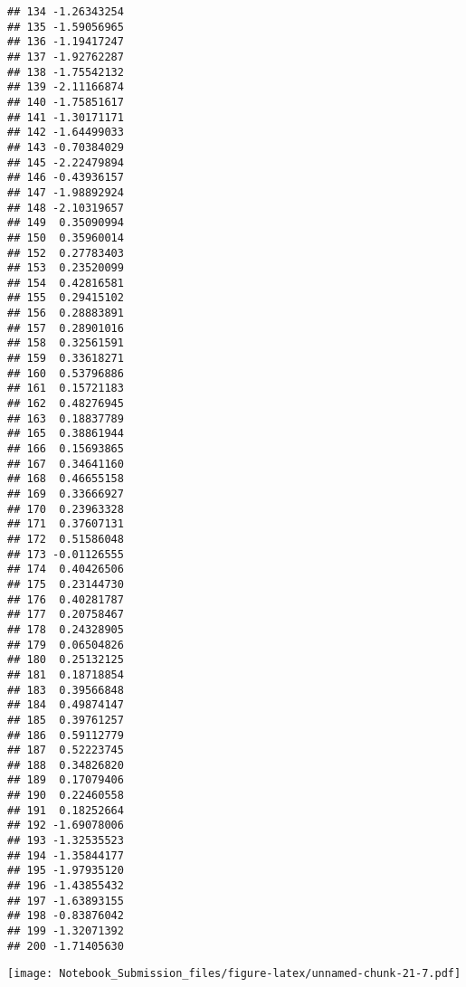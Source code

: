 \documentclass[
]{article}
\newenvironment{Shaded}{\begin{snugshade}}{\end{snugshade}}
\newcommand{\CommentTok}[1]{\textcolor[rgb]{0.56,0.35,0.01}{\textit{#1}}}
\newcommand{\DataTypeTok}[1]{\textcolor[rgb]{0.13,0.29,0.53}{#1}}
\newcommand{\DecValTok}[1]{\textcolor[rgb]{0.00,0.00,0.81}{#1}}
\newcommand{\FloatTok}[1]{\textcolor[rgb]{0.00,0.00,0.81}{#1}}
\newcommand{\KeywordTok}[1]{\textcolor[rgb]{0.13,0.29,0.53}{\textbf{#1}}}
\newcommand{\NormalTok}[1]{#1}
\newcommand{\OperatorTok}[1]{\textcolor[rgb]{0.81,0.36,0.00}{\textbf{#1}}}
\begin{document}
\begin{verbatim}
## 134 -1.26343254
## 135 -1.59056965
## 136 -1.19417247
## 137 -1.92762287
## 138 -1.75542132
## 139 -2.11166874
## 140 -1.75851617
## 141 -1.30171171
## 142 -1.64499033
## 143 -0.70384029
## 145 -2.22479894
## 146 -0.43936157
## 147 -1.98892924
## 148 -2.10319657
## 149  0.35090994
## 150  0.35960014
## 152  0.27783403
## 153  0.23520099
## 154  0.42816581
## 155  0.29415102
## 156  0.28883891
## 157  0.28901016
## 158  0.32561591
## 159  0.33618271
## 160  0.53796886
## 161  0.15721183
## 162  0.48276945
## 163  0.18837789
## 165  0.38861944
## 166  0.15693865
## 167  0.34641160
## 168  0.46655158
## 169  0.33666927
## 170  0.23963328
## 171  0.37607131
## 172  0.51586048
## 173 -0.01126555
## 174  0.40426506
## 175  0.23144730
## 176  0.40281787
## 177  0.20758467
## 178  0.24328905
## 179  0.06504826
## 180  0.25132125
## 181  0.18718854
## 183  0.39566848
## 184  0.49874147
## 185  0.39761257
## 186  0.59112779
## 187  0.52223745
## 188  0.34826820
## 189  0.17079406
## 190  0.22460558
## 191  0.18252664
## 192 -1.69078006
## 193 -1.32535523
## 194 -1.35844177
## 195 -1.97935120
## 196 -1.43855432
## 197 -1.63893155
## 198 -0.83876042
## 199 -1.32071392
## 200 -1.71405630
\end{verbatim}

\begin{Shaded}
\end{Shaded}

\texttt{[image: Notebook\_Submission\_files/figure-latex/unnamed-chunk-21-7.pdf]}
\end{document}

